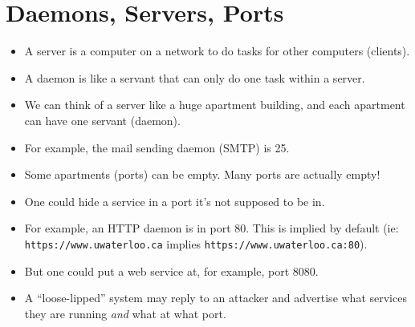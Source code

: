 \documentclass{article}
\begin{document}
\section{Daemons, Servers, Ports}
\begin{itemize}
    \item A server is a computer on a network to do tasks for other computers (clients).
    \item A daemon is like a servant that can only do one task within a server.
    \item We can think of a server like a huge apartment building, and each apartment can have one servant (daemon).
    \item For example, the mail sending daemon (SMTP) is 25.
    \item Some apartments (ports) can be empty.  Many ports are actually empty!
    \item One could hide a service in a port it's not supposed to be in.
    \item For example, an HTTP daemon is in port 80.  This is implied by default (ie: \lstinline{https://www.uwaterloo.ca} implies \lstinline{https://www.uwaterloo.ca:80}).
    \item But one could put a web service at, for example, port 8080.
    \item A ``loose-lipped'' system may reply to an attacker and advertise what services they are running \emph{and} what at what port.
\end{itemize}
\end{document}

